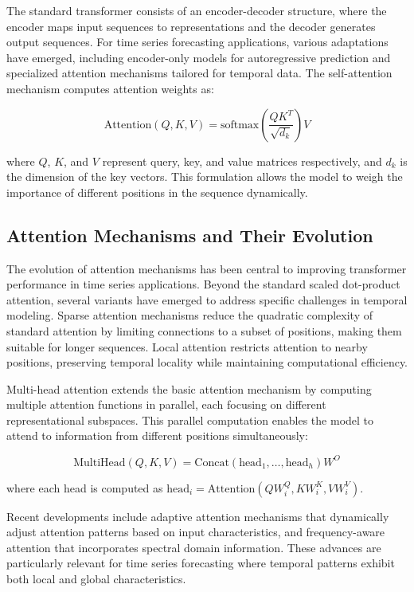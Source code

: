 \documentclass[12pt]{uomthesis}
\begin{document}
The standard transformer consists of an encoder-decoder structure, where the encoder maps input sequences to representations and the decoder generates output sequences. For time series forecasting applications, various adaptations have emerged, including encoder-only models for autoregressive prediction and specialized attention mechanisms tailored for temporal data. The self-attention mechanism computes attention weights as:

\begin{equation}
\text{Attention}(Q, K, V) = \text{softmax}\left(\frac{QK^T}{\sqrt{d_k}}\right)V
\end{equation}

where $Q$, $K$, and $V$ represent query, key, and value matrices respectively, and $d_k$ is the dimension of the key vectors. This formulation allows the model to weigh the importance of different positions in the sequence dynamically.

\subsection{Attention Mechanisms and Their Evolution}

The evolution of attention mechanisms has been central to improving transformer performance in time series applications. Beyond the standard scaled dot-product attention, several variants have emerged to address specific challenges in temporal modeling. Sparse attention mechanisms reduce the quadratic complexity of standard attention by limiting connections to a subset of positions, making them suitable for longer sequences. Local attention restricts attention to nearby positions, preserving temporal locality while maintaining computational efficiency.

Multi-head attention extends the basic attention mechanism by computing multiple attention functions in parallel, each focusing on different representational subspaces. This parallel computation enables the model to attend to information from different positions simultaneously:

\begin{equation}
\text{MultiHead}(Q, K, V) = \text{Concat}(\text{head}_1, \ldots, \text{head}_h)W^O
\end{equation}

where each head is computed as $\text{head}_i = \text{Attention}(QW_i^Q, KW_i^K, VW_i^V)$.

Recent developments include adaptive attention mechanisms that dynamically adjust attention patterns based on input characteristics, and frequency-aware attention that incorporates spectral domain information. These advances are particularly relevant for time series forecasting where temporal patterns exhibit both local and global characteristics.
\end{document}
